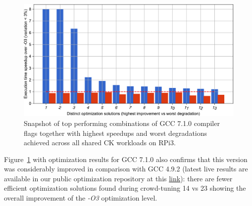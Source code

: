    \begin{figure}[!htbp]
     \centering
      \includegraphics[width=6in]
       {ck-assets/41ed88477436dd3e-cropped.pdf} %
      \vspace{0.1in}
      \vspace{0.1in}
     \caption{
      Snapshot of top performing combinations of GCC 7.1.0 compiler flags together with highest speedups and worst degradations achieved across all shared CK workloads on RPi3.
     }
     \label{fig:ck-snapshot-of-results-gcc7}
   \end{figure}

Figure~\ref{fig:ck-snapshot-of-results-gcc7} with optimization results 
for GCC 7.1.0 also confirms that this version was considerably improved 
in comparison with GCC 4.9.2
(latest live results are available in our public optimization repository
at this \href{http://cknowledge.org/repo/web.php?wcid=8289e0cf24346aa7:79bca2b76876b5c6}{link}):
there are fewer efficient optimization solutions found during crowd-tuning
14 vs 23 showing the overall improvement of the \textit{-O3} optimization level.

